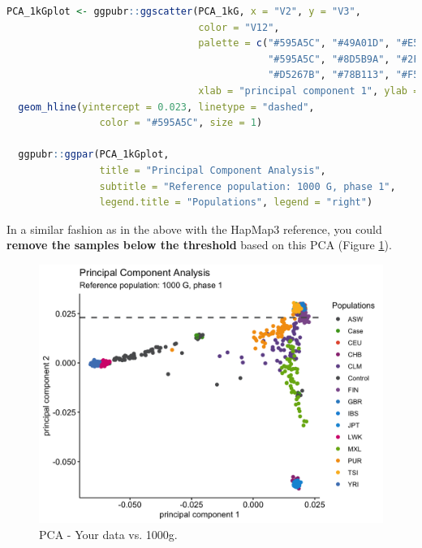 \documentclass[
]{book}
\begin{document}
\begin{lstlisting}[language=R]
PCA_1kGplot <- ggpubr::ggscatter(PCA_1kG, x = "V2", y = "V3",
                                 color = "V12",
                                 palette = c("#595A5C", "#49A01D", "#E55738", "#9A3480", "#705296", 
                                             "#595A5C", "#8D5B9A", "#2F8BC9", "#1290D9", "#1396D8", 
                                             "#D5267B", "#78B113", "#F59D10", "#FBB820", "#4C81BF", "#C5D220"),
                                 xlab = "principal component 1", ylab = "principal component 2") +
  geom_hline(yintercept = 0.023, linetype = "dashed",
                color = "#595A5C", size = 1)

  ggpubr::ggpar(PCA_1kGplot,
                title = "Principal Component Analysis",
                subtitle = "Reference population: 1000 G, phase 1",
                legend.title = "Populations", legend = "right")
\end{lstlisting}

In a similar fashion as in the above with the HapMap3 reference, you could \textbf{remove the samples below the threshold} based on this PCA (Figure \ref{fig:show-pca-1000g}).

\begin{figure}

{\centering \includegraphics[width=18.67in]{img/_gwas/pca-1000g} 

}

\caption{PCA - Your data vs. 1000g.}\label{fig:show-pca-1000g}
\end{figure}
\end{document}
